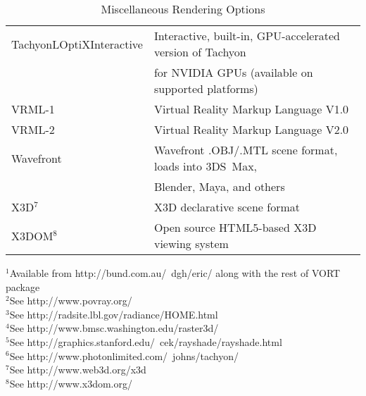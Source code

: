 \begin{table}[htb]
\begin{tabular}{|l|l|}
  TachyonLOptiXInteractive & Interactive, built-in, GPU-accelerated version of Tachyon \\
                           & for NVIDIA GPUs (available on supported platforms) \\
  VRML-1                   & Virtual Reality Markup Language V1.0 \\
  VRML-2                   & Virtual Reality Markup Language V2.0 \\
  Wavefront                & Wavefront .OBJ/.MTL scene format, loads into 3DS~Max, \\
                           & Blender, Maya, and others \\
  X3D$^7$                  & X3D declarative scene format \\
  X3DOM$^8$                & Open source HTML5-based X3D viewing system \\
\hline

\end{tabular}

  $^1$Available from  
    {http://bund.com.au/~dgh/eric/} along with the rest of VORT package \\
  $^2$See 
    {http://www.povray.org/} \\
  $^3$See 
    {http://radsite.lbl.gov/radiance/HOME.html} \\
  $^4$See 
    {http://www.bmsc.washington.edu/raster3d/} \\
  $^5$See 
    {http://graphics.stanford.edu/~cek/rayshade/rayshade.html} \\
  $^6$See 
    {http://www.photonlimited.com/~johns/tachyon/} \\
  $^7$See 
    {http://www.web3d.org/x3d} \\
  $^8$See 
    {http://www.x3dom.org/} \\
\caption{Miscellaneous Rendering Options}
\label{ug:table:render}
\end{table}

